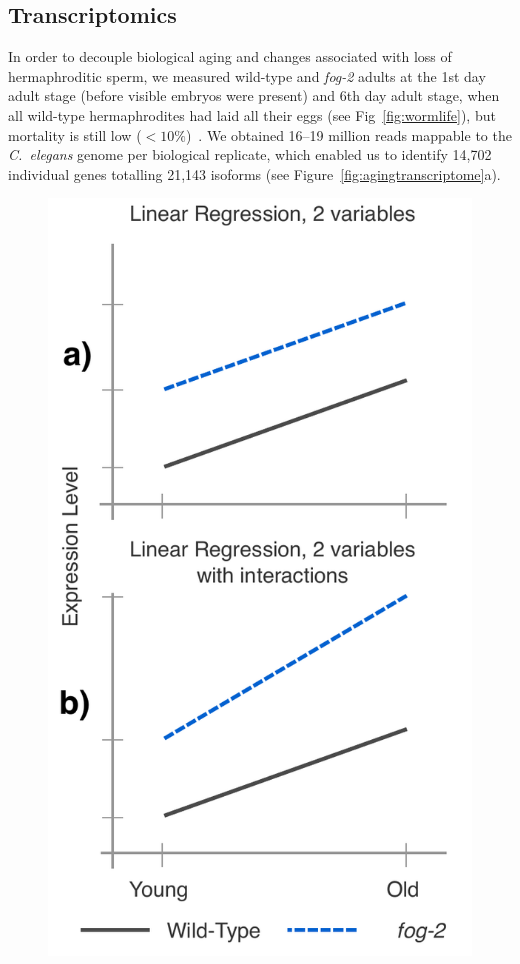 \documentclass[10pt,letterpaper,twocolumn]{article}
\newcommand{\cel}{\emph{C.~elegans}}
\newcommand{\fog}{\emph{\mbox{fog-2}}}
\begin{document}
\subsection*{Transcriptomics}
\label{sub:Transcriptomics}
In order to decouple biological aging and changes associated with loss of hermaphroditic sperm, we measured wild-type and \fog{} adults at the 1st day adult stage (before visible embryos were present) and 6th day adult stage, when all wild-type hermaphrodites had laid all their eggs (see Fig~\ref{fig:wormlife}), but mortality is still low ($<10\%$)~\cite{Stroustrup2013}.  We obtained 16--19 million reads mappable to the \cel{} genome per biological replicate, which enabled us to identify 14,702 individual genes totalling 21,143 isoforms (see Figure~\ref{fig:agingtranscriptome}a).

\begin{figure}[htbp]
\renewcommand{\familydefault}{\sfdefault}\normalfont{}
\centering
\includegraphics[width=0.9\linewidth]{../output/figs/final_figs/linear_regression.pdf}

\end{figure}
\end{document}
